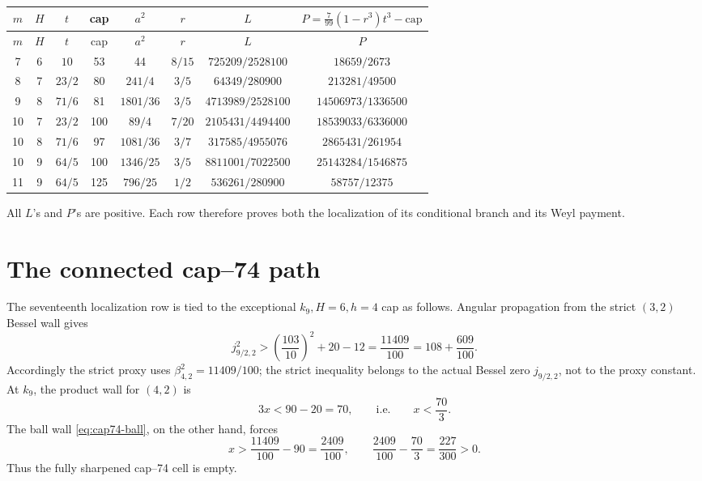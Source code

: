 \documentclass[11pt]{article}
\begin{document}
\begingroup
\small
\renewcommand{\arraystretch}{1.18}
\begin{longtable}{@{}c c c c c c c c@{}}
\toprule
\(m\)&\(H\)&\(t\)&cap&\(a^2\)&\(r\)&\(L\)&
\(P=\frac7{99}(1-r^3)t^3-\mathrm{cap}\)\\
\midrule
\endfirsthead
\toprule
\(m\)&\(H\)&\(t\)&cap&\(a^2\)&\(r\)&\(L\)&\(P\)\\
\midrule
\endhead
7&6&\(10\)&53&44&\(8/15\)&\(725209/2528100\)&\(18659/2673\)\\
8&7&\(23/2\)&80&\(241/4\)&\(3/5\)&\(64349/280900\)&\(213281/49500\)\\
9&8&\(71/6\)&81&\(1801/36\)&\(3/5\)&\(4713989/2528100\)&\(14506973/1336500\)\\
10&7&\(23/2\)&100&\(89/4\)&\(7/20\)&\(2105431/4494400\)&\(18539033/6336000\)\\
10&8&\(71/6\)&97&\(1081/36\)&\(3/7\)&\(317585/4955076\)&\(2865431/261954\)\\
10&9&\(64/5\)&100&\(1346/25\)&\(3/5\)&\(8811001/7022500\)&\(25143284/1546875\)\\
11&9&\(64/5\)&125&\(796/25\)&\(1/2\)&\(536261/280900\)&\(58757/12375\)\\
\bottomrule
\end{longtable}
\endgroup
All \(L\)'s and \(P\)'s are positive.  Each row therefore proves both
the localization of its conditional branch and its Weyl payment.

\section{The connected cap--74 path}

The seventeenth localization row is tied to the exceptional
\(k_9,H=6,h=4\) cap as follows.  Angular propagation from the strict
\((3,2)\) Bessel wall gives
\begin{equation}
 j_{9/2,2}^2>\left(\frac{103}{10}\right)^2+20-12
 =\frac{11409}{100}=108+\frac{609}{100}.
 \label{eq:cap74-ball}
\end{equation}
Accordingly the strict proxy uses
\(\beta_{4,2}^2=11409/100\); the strict inequality belongs to the actual
Bessel zero \(j_{9/2,2}\), not to the proxy constant.
At \(k_9\), the product wall for \((4,2)\) is
\[
 3x<90-20=70,
 \qquad\text{i.e.}\qquad x<\frac{70}{3}.
\]
The ball wall \eqref{eq:cap74-ball}, on the other hand, forces
\[
 x>\frac{11409}{100}-90=\frac{2409}{100},
 \qquad
 \frac{2409}{100}-\frac{70}{3}=\frac{227}{300}>0.
\]
Thus the fully sharpened cap--74 cell is empty.
\end{document}
